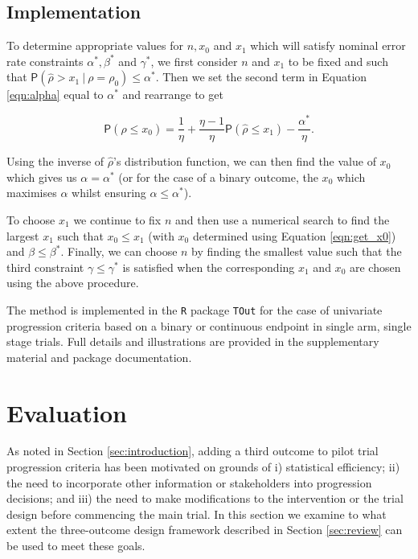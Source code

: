 \documentclass{bmcart}
\newcommand{\PR}{{\mathsf P}}
\begin{document}
\subsection{Implementation}

To determine appropriate values for $n, x_0$ and $x_1$ which will satisfy nominal error rate constraints $\alpha^*, \beta^*$ and $\gamma^*$, we first consider $n$ and $x_1$ to be fixed and such that $\PR(\hat{\rho} > x_1 ~|~ \rho = \rho_0) \leq \alpha^*$. Then we set the second term in Equation \ref{eqn:alpha} equal to $\alpha^*$ and rearrange to get

\begin{equation}\label{eqn:get_x0}
\PR(\hat{\rho} \leq x_0) = \frac{1}{\eta} + \frac{\eta - 1}{\eta}\PR(\hat{\rho} \leq x_1) - \frac{\alpha^*}{\eta}.
\end{equation}

Using the inverse of $\hat{\rho}$'s distribution function, we can then find the value of $x_0$ which gives us $\alpha = \alpha^*$ (or for the case of a binary outcome, the $x_0$ which maximises $\alpha$ whilst ensuring $\alpha \leq \alpha^*$).

To choose $x_1$ we continue to fix $n$ and then use a numerical search to find the largest $x_1$ such that $x_0 \leq x_1$ (with $x_0$ determined using Equation \ref{eqn:get_x0}) and $\beta \leq \beta^*$. Finally, we can choose $n$ by finding the smallest value such that the third constraint $\gamma \leq \gamma^*$ is satisfied when the corresponding $x_1$ and $x_0$ are chosen using the above procedure.

The method is implemented in the \texttt{R} package \texttt{TOut} for the case of univariate progression criteria based on a binary or continuous endpoint in single arm, single stage trials. Full details and illustrations are provided in the supplementary material and package documentation.

\section{Evaluation}\label{sec:methods}

As noted in Section \ref{sec:introduction}, adding a third outcome to pilot trial progression criteria has been motivated on grounds of i) statistical efficiency; ii) the need to incorporate other information or stakeholders into progression decisions; and iii) the need to make modifications to the intervention or the trial design before commencing the main trial. In this section we examine to what extent the three-outcome design framework described in Section \ref{sec:review} can be used to meet these goals.
\end{document}

